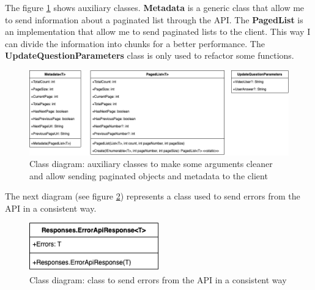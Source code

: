             The figure \ref{fig:implementation_auxiliary} shows auxiliary classes. \textbf{Metadata} is a generic class that allow me to send information about a paginated 
            list through the API. The \textbf{PagedList} is an implementation that allow me to send paginated lists to the client. This way I can divide the information into chunks
            for a better performance. The \textbf{UpdateQuestionParameters} class is only used to refactor some functions.
            \begin{figure}[H]
                \centering
                    \includegraphics[width=\textwidth]{assets/diagrams/auxiliary.png}
                \caption{Class diagram: auxiliary classes to make some arguments cleaner and allow sending paginated objects and metadata to the client}
                \label{fig:implementation_auxiliary}
            \end{figure}

            The next diagram (see figure \ref{fig:implementation_error_response}) represents a class used to send errors from the API in a consistent way. 
            \begin{figure}[H]
                \centering
                    \includegraphics[width=0.5\textwidth]{assets/diagrams/error_response.png}
                \caption{Class diagram: class to send errors from the API in a consistent way}
                \label{fig:implementation_error_response}
            \end{figure}

